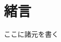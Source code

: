 \documentclass[main]{subfiles}
\begin{document}
\chapter{緒言}
ここに諸元を書く \cite{ref:mnih2013playing}
\end{document}
